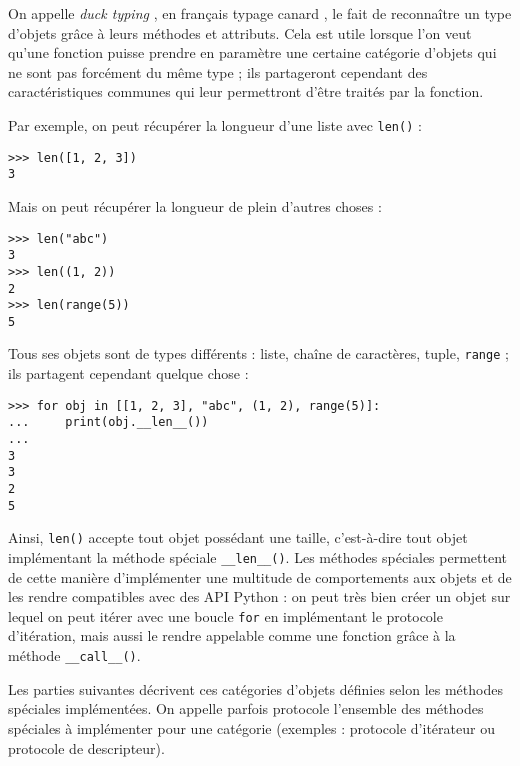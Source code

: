On appelle \emph{duck typing} , en français \og typage canard \fg{}, le fait de reconnaître un type d'objets grâce à leurs méthodes et attributs. Cela est utile lorsque l'on veut qu'une fonction puisse prendre en paramètre une certaine catégorie d'objets qui ne sont pas forcément du même type ; ils partageront cependant des caractéristiques communes qui leur permettront d'être traités par la fonction.\medskip

Par exemple, on peut récupérer la longueur d'une liste avec \texttt{len()} :

\begin{verbatim}
>>> len([1, 2, 3])
3
\end{verbatim}

Mais on peut récupérer la longueur de plein d'autres choses :

\begin{verbatim}
>>> len("abc")
3
>>> len((1, 2))
2
>>> len(range(5))
5
\end{verbatim}

Tous ses objets sont de types différents : liste, chaîne de caractères, tuple, \texttt{range} ; ils partagent cependant quelque chose :

\begin{verbatim}
>>> for obj in [[1, 2, 3], "abc", (1, 2), range(5)]:
...     print(obj.__len__())
...
3
3
2
5
\end{verbatim}

Ainsi, \texttt{len()} accepte tout objet possédant une taille, c'est-à-dire tout objet implémentant la méthode spéciale \texttt{__len__()}. Les méthodes spéciales permettent de cette manière d'implémenter une multitude de comportements aux objets et de les rendre compatibles avec des API Python : on peut très bien créer un objet sur lequel on peut itérer avec une boucle \texttt{for} en implémentant le protocole d'itération, mais aussi le rendre appelable comme une fonction grâce à la méthode \texttt{__call__()}.\medskip

Les parties suivantes décrivent ces catégories d'objets définies selon les méthodes spéciales implémentées. On appelle parfois protocole l'ensemble des méthodes spéciales à implémenter pour une catégorie (exemples : protocole d'itérateur ou protocole de descripteur).
